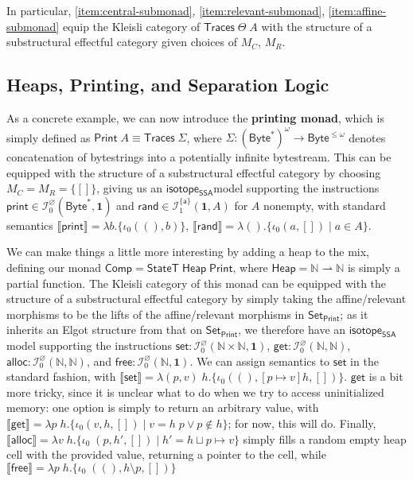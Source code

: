 \documentclass[acmsmall,screen,review]{acmart}
\newcommand{\mc}[1]{\ensuremath{\mathcal{#1}}}
\newcommand{\mb}[1]{\ensuremath{\mathbf{#1}}}
\newcommand{\ms}[1]{\ensuremath{\mathsf{#1}}}
\newcommand{\nats}{\mathbb{N}}
\newcommand{\taff}{{\{\ms{a}\}}}
\newcommand{\dnt}[1]{\llbracket{#1}\rrbracket}
\newcommand{\isotopessa}{\ms{isotope_{SSA}}}
\begin{document}
In particular, \ref{item:central-submonad}, \ref{item:relevant-submonad},
\ref{item:affine-submonad} equip the Kleisli category of
\(\ms{Traces}\;\Theta\;A\) with the structure of a substructural effectful
category given choices of \(M_C\), \(M_R\).

\subsection{Heaps, Printing, and Separation Logic}

\label{ssec:separation}

As a concrete example, we can now introduce the \textbf{printing monad}, which
is simply defined as \(\ms{Print}\;A \equiv \ms{Traces}\;\Sigma\), where
\(\Sigma: (\ms{Byte}^*)^\omega \to \ms{Byte}^{\leq \omega}\) denotes
concatenation of bytestrings into a potentially infinite bytestream. This can be
equipped with the structure of a substructural effectful category by choosing
\(M_C = M_R = \{[]\}\), giving us an \isotopessa model supporting the
instructions \(\ms{print} \in \mc{I}^\varnothing_0(\ms{Byte}^*, \mb{1})\) and
\(\ms{rand} \in \mc{I}^\taff_1(\mb{1}, A)\) for \(A\) nonempty, with standard
semantics \(\dnt{\ms{print}} = \lambda b.\{\iota_0 ((), b)\}\),
\(\dnt{\ms{rand}} = \lambda (). \{\iota_0 (a, []) \mid a \in A\}\).

We can make things a little more interesting by adding a heap to the mix,
defining our monad \(\ms{Comp} = \ms{StateT}\;\ms{Heap}\;\ms{Print}\), where
\(\ms{Heap} = \nats \rightharpoonup \nats\) is simply a partial function. The
Kleisli category of this monad can be equipped with the structure of a
substructural effectful category by simply taking the affine/relevant morphisms
to be the lifts of the affine/relevant morphisms in \(\ms{Set}_{\ms{Print}}\);
as it inherits an Elgot structure from that on \(\ms{Set}_{\ms{Print}}\), we
therefore have an \isotopessa model supporting the instructions \(\ms{set}:
\mc{I}^\varnothing_0(\nats \times \nats, \mb{1})\), \(\ms{get}:
\mc{I}^\varnothing_0(\nats, \nats)\), \(\ms{alloc}: \mc{I}^\varnothing_0(\nats,
\nats)\), and \(\ms{free}: \mc{I}^\varnothing_0(\nats, \mb{1})\). We can assign
semantics to \(\ms{set}\) in the standard fashion, with \(\dnt{\ms{set}} =
\lambda (p, v)\;h. \{\iota_0((), [p \mapsto v]h, [])\}\). \(\ms{get}\) is a bit
more tricky, since it is unclear what to do when we try to access uninitialized
memory: one option is simply to return an arbitrary value, with \(\dnt{\ms{get}}
= \lambda p\;h. \{\iota_0(v, h, []) \mid v = h\;p \lor p \notin h\}\); for now,
this will do. Finally, \(\dnt{\ms{alloc}} = \lambda v\;h.\{\iota_0\;(p, h', [])
\mid h' = h \sqcup p \mapsto v\}\) simply fills a random empty heap cell with
the provided value, returning a pointer to the cell, while \(\dnt{\ms{free}} =
\lambda p\;h. \{\iota_0\;((), h \setminus p, [])\}\)
\end{document}
